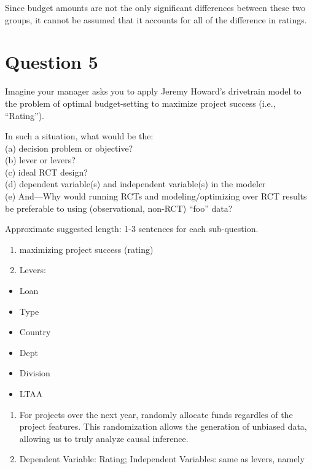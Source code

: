 \documentclass[11pt]{article}
\providecommand{\tightlist}{%
      \setlength{\itemsep}{0pt}\setlength{\parskip}{0pt}}
\begin{document}
Since budget amounts are not the only significant differences between
these two groups, it cannot be assumed that it accounts for all of the
difference in ratings.

    \hypertarget{question-5}{%
\section{Question 5}\label{question-5}}

Imagine your manager asks you to apply Jeremy Howard's drivetrain model
to the problem of optimal budget-setting to maximize project success
(i.e., ``Rating'').

In such a situation, what would be the:\\
(a) decision problem or objective?\\
(b) lever or levers?\\
(c) ideal RCT design?\\
(d) dependent variable(s) and independent variable(s) in the modeler\\
(e) And---Why would running RCTs and modeling/optimizing over RCT
results be preferable to using (observational, non-RCT) ``foo'' data?

Approximate suggested length: 1-3 sentences for each sub-question.

    \begin{enumerate}
\def\labelenumi{(\alph{enumi})}
\item
  maximizing project success (rating)
\item
  Levers:
\end{enumerate}

\begin{itemize}
\tightlist
\item
  Loan
\item
  Type
\item
  Country
\item
  Dept
\item
  Division
\item
  LTAA
\end{itemize}

\begin{enumerate}
\def\labelenumi{(\alph{enumi})}
\setcounter{enumi}{2}
\item
  For projects over the next year, randomly allocate funds regardles of
  the project features. This randomization allows the generation of
  unbiased data, allowing us to truly analyze causal inference.
\item
  Dependent Variable: Rating; Independent Variables: same as levers,
  namely\\
\end{enumerate}
\end{document}
